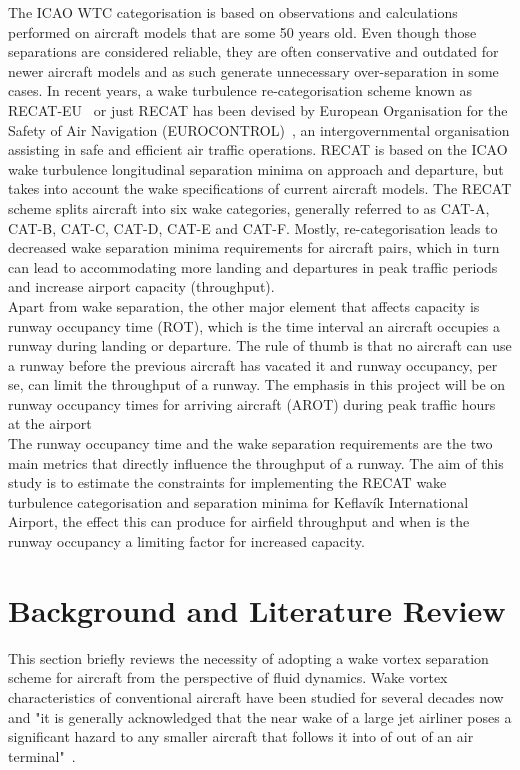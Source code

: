 The ICAO WTC categorisation is based on observations and calculations performed on aircraft models that are some 50 years old. Even though those separations are considered reliable, they are often conservative and outdated for newer aircraft models and as such generate unnecessary over-separation in some cases.
In recent years, a wake turbulence re-categorisation scheme known as RECAT-EU~\cite{rooseleer2015recat} or just RECAT has been devised by European Organisation for the Safety of Air Navigation (EUROCONTROL)~\cite{EUROCONTROL_recat_eu}, an intergovernmental organisation assisting in safe and efficient air traffic operations. RECAT is based on the ICAO wake turbulence longitudinal separation minima on approach and departure, but takes into account the wake specifications of current aircraft models. The RECAT scheme splits aircraft into six wake categories, generally referred to as CAT-A, CAT-B, CAT-C, CAT-D, CAT-E and CAT-F. Mostly, re-categorisation leads to decreased wake separation minima requirements for aircraft pairs, which in turn can lead to accommodating more landing and departures in peak traffic periods and increase airport capacity (throughput).\\
Apart from wake separation, the other major element that affects capacity is runway occupancy time (ROT), which is the time interval an aircraft occupies a runway during landing or departure. The rule of thumb is that no aircraft can use a runway before the previous aircraft has vacated it and runway occupancy, per se, can limit the throughput of a runway. The emphasis in this project will be on runway occupancy times for arriving aircraft (AROT) during peak traffic hours at the airport\\
The runway occupancy time and the wake separation requirements are the two main metrics that directly influence the throughput of a runway. The aim of this study is to estimate the constraints for implementing the RECAT wake turbulence categorisation and separation minima for Keflavík International Airport, the effect this can produce for airfield throughput and when is the runway occupancy a limiting factor for increased capacity. 

\section{Background and Literature Review}
This section briefly reviews the necessity of adopting a wake vortex separation scheme for aircraft from the perspective of fluid dynamics. Wake vortex characteristics of conventional aircraft have been studied for several decades now and "it is generally acknowledged that the near wake of a large jet airliner poses a significant hazard to any smaller aircraft that follows it into of out of an air terminal"~\cite[p.~5]{dup._donamdson_vortex_1975}. 


